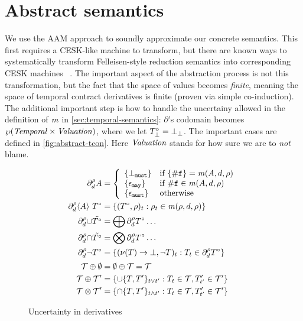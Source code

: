 

\section{Abstract semantics}\label{sec:abstract-semantics}

We use the AAM approach to soundly approximate our concrete semantics.
%
This first requires a CESK-like machine to transform, but there are known ways to systematically transform Felleisen-style reduction semantics into corresponding CESK machines ~\citep{dvanhorn:Danvy-Nielsen:RS-04-26}.
%
The important aspect of the abstraction process is not this transformation, but the fact that the space of values becomes \emph{finite}, meaning the space of temporal contract derivatives is finite (proven via simple co-induction).
%
The additional important step is how to handle the uncertainy allowed in the definition of $\mathit{m}$ in \autoref{sec:temporal-semantics}: $\partial$'s codomain becomes $\wp(\mathit{Temporal} \times \mathit{Valuation})$, where we let $T^\circ_\bot = \bot_\bot$.
%
The important cases are defined in \autoref{fig:abstract-tcon}.
%
Here $\mathit{Valuation}$ stands for how sure we are to \emph{not} blame.
\begin{figure}
  \begin{align*}
    \partial_{d}^{\rho}{A} &= \left\{
      \begin{array}{ll}
        \{\bot_{\tt must}\} & \text{if } \{{\tt \#f}\} = \mathit{m}(A, d, \rho) \\
        \{\epsilon_{\tt may}\} & \text{if } {\tt \#f} \in \mathit{m}(A, d, \rho) \\
        \{\epsilon_{\tt must}\} & \text{otherwise}
      \end{array}
    \right. \\
    \partial_{d}^{\rho}{\langle A\rangle\ T^\circ} &=
    \left\{(T^\circ,\rho)_t : \rho_t \in \mathit{m}(\rho,d,\rho)\right\} \\
    \partial_{d}^{\rho}{\cup \tilde{T^\circ}} &= \bigoplus \partial_{d}^{\rho}{T^\circ}\ldots \\
    \partial_{d}^{\rho}{\cap \tilde{T^\circ}} &= \bigotimes \partial_{d}^{\rho}{T^\circ}\ldots \\
    \partial_{d}^{\rho}{\neg T^\circ} &= \left\{(\nu(T)\to \bot,\neg T)_t : T_t \in \partial_{d}^{\rho}{T^\circ}\right\}
    \\[2pt]
    {\mathcal T} \oplus \emptyset &= \emptyset \oplus {\mathcal T} = {\mathcal T} \\
    {\mathcal T} \oplus {\mathcal T}' &= \left\{\cup \{T,T'\}_{t \vee t'} : T_t \in {\mathcal T}, T'_{t'} \in {\mathcal T}'\right\} \\
    {\mathcal T} \otimes {\mathcal T}' &= \left\{\cap \{T,T'\}_{t \wedge t'} : T_t \in {\mathcal T}, T'_{t'} \in {\mathcal T}'\right\} \\
  \end{align*}
  \caption{Uncertainty in derivatives}
  \label{fig:abstract-tcon}
\end{figure}

